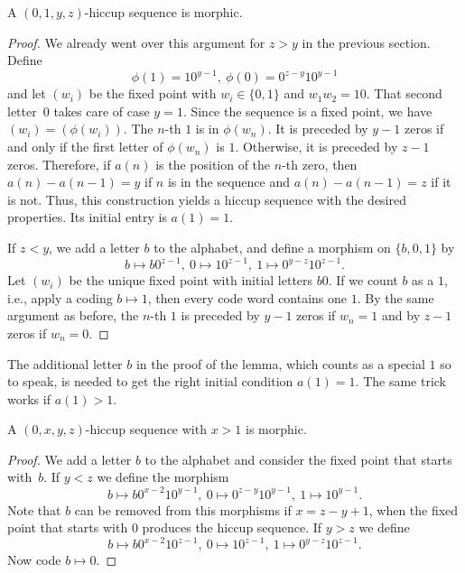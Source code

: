 \documentclass[12pt,reqno]{article}
\begin{document}
\begin{lemma}\label{lem:01yz}
    A $(0,1,y,z)$-hiccup sequence is morphic.
\end{lemma}
\begin{proof}
    We already went over this argument for $z>y$ in the previous section. 
    Define 
    \begin{equation}\label{eq:4}
    \phi(1)=10^{y-1},\ \phi(0)=0^{z-y}10^{y-1}
    \end{equation} 
    and let $(w_i)$ be the
    fixed point with $w_i\in\{0,1\}$ and $w_1w_2=10$. That second letter~$0$
    takes care of case $y=1$.
    Since the sequence is a fixed point, we have $(w_i)=(\phi(w_i))$. 
    The $n$-th $1$ is in $\phi(w_n)$. It is 
    preceded by $y-1$ zeros if and only if the first letter of $\phi(w_n)$
    is $1$. Otherwise, it is preceded by $z-1$ zeros. 
    Therefore, if $a(n)$ is the position of the $n$-th zero, then 
    $a(n)-a(n-1)=y$ if $n$ is in the sequence and 
    $a(n)-a(n-1)=z$ if it is not. Thus, this construction yields a hiccup sequence with the desired properties. Its initial entry is $a(1)=1$. 

    If $z<y$, 
    we add a letter $b$ to the alphabet, and define a morphism on $\{b,0,1\}$
    by 
    \begin{equation}\label{eq:5}
b\mapsto b0^{z-1},\ 0\mapsto 10^{z-1},\ 1\mapsto 0^{y-z}10^{z-1}.
    \end{equation}
    Let $(w_i)$ be the unique fixed point with initial letters $b0$. 
    If we count $b$ as a $1$, i.e., apply a coding $b\mapsto 1$,
    then every code word contains one $1$.  
    By the same argument as before, the $n$-th $1$ is preceded by $y-1$ zeros if 
    $w_n=1$ and by $z-1$ zeros if $w_n=0$.
\end{proof}

The additional letter $b$ in the proof of the lemma, which counts as a special $1$ so to speak, is needed to get the 
right initial condition $a(1)=1$. The same trick works if $a(1)>1$.

\begin{lemma}\label{lem:oxyz}
    A $(0,x,y,z)$-hiccup sequence with $x>1$
    is morphic.
\end{lemma}
\begin{proof}
    We add a letter $b$ to the alphabet and consider the fixed point that
    starts with~$b$.
    If $y<z$ we define the morphism  
    \begin{equation}\label{eq:6}
    b\mapsto b0^{x-2}10^{y-1},\ 0\mapsto 0^{z-y}10^{y-1},\ 1\mapsto 10^{y-1}.
    \end{equation}
    Note that $b$ can be removed from this morphisms if $x=z-y+1$,
    when the fixed point that starts with $0$ produces the hiccup sequence. If $y>z$ we define
    \begin{equation}\label{eq:7}
    b\mapsto b0^{x-2}10^{z-1},\ 0\mapsto 10^{z-1},\ 1\mapsto 0^{y-z}10^{z-1}.
    \end{equation}
    Now code $b\mapsto 0$. 
\end{proof}
\end{document}
